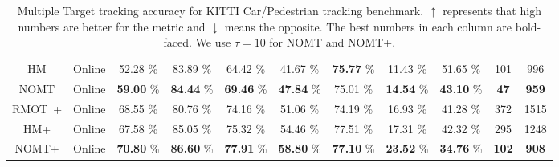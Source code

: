 \documentclass[10pt,twocolumn,letterpaper]{article}
\begin{document}
\begin{table*}
\begin{center}
{\begin{tabular}{| c || c || c | c | c || c | c | c | c | c | c |}
\hline
HM & Online & 52.28 \% & 83.89 \% & 64.42 \% & 41.67 \% & {\bf 75.77} \% & 11.43 \% & 51.65 \% & 101 & 996 \\
NOMT & Online & {\bf 59.00} \% & {\bf 84.44} \% & {\bf 69.46} \% & {\bf 47.84} \% & 75.01 \% & {\bf 14.54} \% & {\bf 43.10} \% & {\bf 47} & {\bf 959} \\
\hline
\hline
RMOT~\cite{YoonWACV2015}+\cite{wang2013regionlets} & Online & 68.55 \% & 80.76 \% & 74.16 \% & 51.06 \% & 74.19 \% & 16.93 \% & 41.28 \% & 372 & 1515 \\
\hline
HM+\cite{wang2013regionlets} & Online & 67.58 \% & 85.05 \% & 75.32 \% & 54.46  \% & 77.51 \% & 17.31 \% & 42.32 \% & 295 & 1248\\
NOMT+\cite{wang2013regionlets} & Online & {\bf 70.80} \% & {\bf 86.60} \% & {\bf 77.91} \% & {\bf 58.80}  \% & {\bf 77.10} \% & {\bf 23.52} \% & {\bf 34.76} \% & {\bf 102} & {\bf 908}\\
\hline
\end{tabular}
}
\caption{Multiple Target tracking accuracy for KITTI Car/Pedestrian tracking benchmark. $\uparrow$ represents that high numbers are better for the metric and $\downarrow$ means the opposite. The best numbers in each column are bold-faced. We use $\tau = 10$ for NOMT and NOMT+\cite{wang2013regionlets}.}
\label{tab:test}
\end{center}
 \end{table*}
\end{document}
